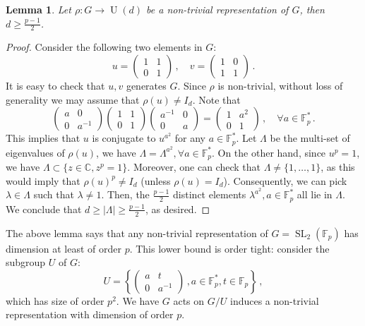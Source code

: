\documentclass[12pt]{amsart}
\newtheorem{lemma}[theorem]{Lemma}
\newcommand{\F}{\mathbb{F}}
\begin{document}
\begin{lemma}\label{lem-rep}
    Let $\rho:G\to \operatorname{U}(d)$ be a non-trivial representation of $G$, then $d\ge \tfrac{p-1}{2}$. 
\end{lemma}
\begin{proof}
Consider the following two elements in $G$: 
\[
u=\left(\begin{matrix}
    1&1\\
    0&1
\end{matrix}\right)\,,\quad 
v=\left(\begin{matrix}
    1&0\\
    1&1
\end{matrix}\right)\,.
\]
It is easy to check that $u,v$ generates $G$. Since $\rho$ is non-trivial, without loss of generality we may assume that $\rho(u)\neq I_d$. Note that
\[
\left(\begin{matrix}
    a&0\\
    0&a^{-1}
\end{matrix}\right)\left(\begin{matrix}
    1&1\\
    0&1
\end{matrix}\right)\left(\begin{matrix}
    a^{-1}&0\\
    0&a
\end{matrix}\right)=\left(\begin{matrix}
    1&a^2\\
    0&1
\end{matrix}\right)\,,\quad\forall a\in \F_p^*\,.
\]
This implies that $u$ is conjugate to $u^{a^2}$ for any $a\in \F_p^*$. Let $\Lambda$ be the multi-set of eigenvalues of $\rho(u)$, we have $\Lambda=\Lambda^{a^2},\forall a\in \F_p^*$. On the other hand, since $u^p=1$, we have $\Lambda\subset \{z\in \mathbb C,z^p=1\}$. Moreover, one can check that $\Lambda\neq \{1,\dots,1\}$, as this would imply that $\rho(u)^p\neq I_d$ (unless $\rho(u)=I_d$). Consequently, we can pick $\lambda\in \Lambda$ such that $\lambda\neq 1$. Then, the $\tfrac{p-1}{2}$ distinct elements $\lambda^{a^2},a\in \F_p^*$ all lie in $\Lambda$. We conclude that $d\ge |\Lambda|\ge \frac{p-1}{2}$, as desired.
\end{proof}
The above lemma says that any non-trivial representation of $G=\operatorname{SL}_2(\F_p)$ has dimension at least of order $p$. This lower bound is order tight: consider the subgroup $U$ of $G$:
\[
U=\left\{\left(\begin{matrix}
    a&t\\
    0&a^{-1}
\end{matrix}\right)\,,a\in \F_p^*,t\in \F_p\right\}\,,
\]
which has size of order $p^2$. We have $G$ acts on $G/U$ induces a non-trivial representation with dimension of order $p$.
\end{document}
